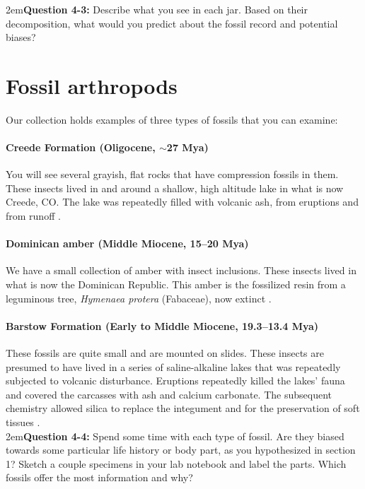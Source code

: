 \documentclass[letterpaper, 11pt]{article}
\begin{document}
\hangindent2em\textbf{Question 4-3:} Describe what you see in each jar. Based on their decomposition, what would you predict about the fossil record and potential biases?

\section{Fossil arthropods}
Our collection holds examples of three types of fossils that you can examine: 

\paragraph{Creede Formation (Oligocene, $\sim$27 Mya)} You will see several grayish, flat rocks that have compression fossils in them. These insects lived in and around a shallow, high altitude lake in what is now Creede, CO. The lake was repeatedly filled with volcanic ash, from eruptions and from runoff \citep{berkeley}.

\paragraph{Dominican amber (Middle Miocene, 15--20 Mya)} We have a small collection of amber with insect inclusions. These insects lived in what is now the Dominican Republic. This amber is the fossilized resin from a leguminous tree, \textit{Hymenaea protera} (Fabaceae), now extinct \citep{IturraldeVinent1850}.

\paragraph{Barstow Formation (Early to Middle Miocene, 19.3--13.4 Mya)} These fossils are quite small and are mounted on slides. These insects are presumed to have lived in a series of saline-alkaline lakes that was repeatedly subjected to volcanic disturbance. Eruptions repeatedly killed the lakes' fauna and covered the carcasses with ash and calcium carbonate. The subsequent chemistry allowed silica to replace the integument and for the preservation of soft tissues \citep{PARK01042001}.\\

\hangindent2em\textbf{Question 4-4:} Spend some time with each type of fossil. Are they biased towards some particular life history or body part, as you hypothesized in section 1? Sketch a couple specimens in your lab notebook and label the parts. Which fossils offer the most information and why?
\end{document}
